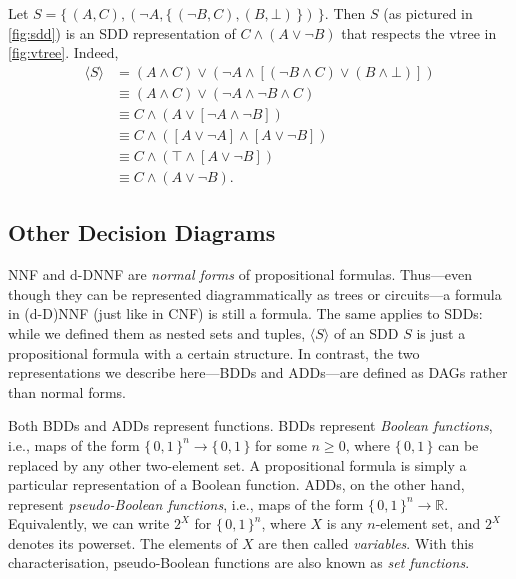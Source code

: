 \begin{example}
  Let $S = \{\, (A, C), (\neg A, \{\, (\neg B, C), (B, \bot) \,\}) \,\}$. Then
  $S$ (as pictured in \cref{fig:sdd}) is an SDD representation of
  $C \land (A \lor \neg B)$ that respects the vtree in \cref{fig:vtree}. Indeed,
  \begin{align*}
    \langle S \rangle &= (A \land C) \lor (\neg A \land [(\neg B \land C) \lor (B \land \bot)]) \\
    &\equiv (A \land C) \lor (\neg A \land \neg B \land C) \\
    &\equiv C \land (A \lor [\neg A \land \neg B]) \\
    &\equiv C \land ([A \lor \neg A] \land [A \lor \neg B]) \\
    &\equiv C \land (\top \land [A \lor \neg B]) \\
    &\equiv C \land (A \lor \neg B).
  \end{align*}
\end{example}

\subsection{Other Decision Diagrams}\label{sec:dds}

NNF and d-DNNF are \emph{normal forms} of propositional formulas. Thus---even
though they can be represented diagrammatically as trees or circuits---a formula
in (d-D)NNF (just like in CNF) is still a formula. The same applies to SDDs:
while we defined them as nested sets and tuples, $\langle S \rangle$ of an SDD
$S$ is just a propositional formula with a certain structure. In contrast, the
two representations we describe here---BDDs and ADDs---are defined as DAGs
rather than normal forms.

Both BDDs and ADDs represent functions. BDDs represent \emph{Boolean functions},
i.e., maps of the form ${\{\, 0, 1 \,\}}^n \to \{\, 0, 1 \,\}$ for some
$n \ge 0$, where $\{\, 0, 1 \,\}$ can be replaced by any other two-element set.
A propositional formula is simply a particular representation of a Boolean
function. ADDs, on the other hand, represent \emph{pseudo-Boolean functions},
i.e., maps of the form ${\{\, 0, 1 \,\}}^n \to \mathbb{R}$. Equivalently, we can
write $2^X$ for ${\{\, 0, 1 \,\}}^n$, where $X$ is any $n$-element set, and
$2^X$ denotes its powerset. The elements of $X$ are then called
\emph{variables}. With this characterisation, pseudo-Boolean functions are also
known as \emph{set functions}.

